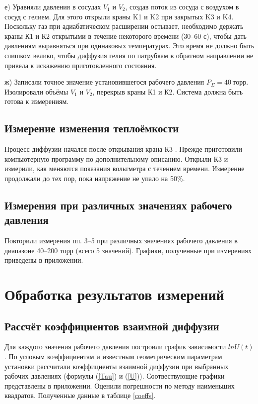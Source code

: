 \documentclass[a4paper, 12pt]{article}
\begin{document}
        е) Уравняли давления в сосудах $V_1$ и $V_2$, создав поток из сосуда с воздухом в сосуд с гелием. Для этого открыли краны K1 и K2 при закрытых K3 и K4. Поскольку газ при адиабатическом расширении остывает, необходимо держать краны К1 и К2 открытыми в течение некоторого времени (30–60 с), чтобы дать давлениям выравняться при одинаковых температурах. Это время не должно быть слишком велико, чтобы диффузия гелия по патрубкам в обратном направлении не привела к искажению приготовленного состояния.

        ж) Записали точное значение установившегося рабочего давления $P_{\Sigma} = 40~торр$. Изолировали объёмы $V_1$ и $V_2$, перекрыв краны К1 и К2. Система должна быть готова к измерениям.

    \subsection{Измерение изменения теплоёмкости}

        Процесс диффузии начался после открывания крана К3 . Прежде приготовили компьютерную программу по дополнительному описанию. Открыли К3 и измерили, как меняются показания вольтметра с течением времени. Измерение продолжали до тех пор, пока напряжение не упало на 50\%.

    \subsection{Измерения при различных значениях рабочего давления}

        Повторили измерения пп. 3–5 при различных значениях рабочего давления в диапазоне 40–200 торр (всего 5 значений). Графики, полученные при измерениях приведены в приложении.

    \section{Обработка результатов измерений}

    \subsection{Рассчёт коэффициентов взаимной диффузии}

        Для каждого значения рабочего давления построили график зависимости $lnU(t)$.  По угловым коэффициентам и известным геометрическим параметрам установки рассчитали коэффициенты взаимной диффузии при выбранных рабочих давлениях (формулы (\ref{Tau}) и (\ref{U})). Соотвествующие графики представлены в приложении. Оценили погрешности по методу наименьших квадратов. Полученные данные в таблице \ref{coeffs}.
\end{document}
